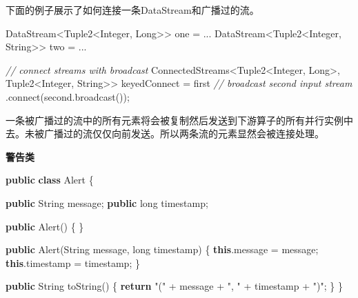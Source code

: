 \documentclass[cn,11pt,chinese]{elegantbook}
\newenvironment{Shaded}{}{}
\newcommand{\BuiltInTok}[1]{#1}
\newcommand{\CommentTok}[1]{\textcolor[rgb]{0.38,0.63,0.69}{\textit{#1}}}
\newcommand{\DataTypeTok}[1]{\textcolor[rgb]{0.56,0.13,0.00}{#1}}
\newcommand{\FunctionTok}[1]{\textcolor[rgb]{0.02,0.16,0.49}{#1}}
\newcommand{\KeywordTok}[1]{\textcolor[rgb]{0.00,0.44,0.13}{\textbf{#1}}}
\newcommand{\NormalTok}[1]{#1}
\newcommand{\StringTok}[1]{\textcolor[rgb]{0.25,0.44,0.63}{#1}}
\begin{document}
下面的例子展示了如何连接一条DataStream和广播过的流。

\begin{Shaded}
\begin{Highlighting}[]
\NormalTok{DataStream\textless{}Tuple2\textless{}}\BuiltInTok{Integer}\NormalTok{, }\BuiltInTok{Long}\NormalTok{\textgreater{}\textgreater{} one = ...}
\NormalTok{DataStream\textless{}Tuple2\textless{}}\BuiltInTok{Integer}\NormalTok{, }\BuiltInTok{String}\NormalTok{\textgreater{}\textgreater{} two = ...}

\CommentTok{// connect streams with broadcast}
\NormalTok{ConnectedStreams\textless{}Tuple2\textless{}}\BuiltInTok{Integer}\NormalTok{, }\BuiltInTok{Long}\NormalTok{\textgreater{}, Tuple2\textless{}}\BuiltInTok{Integer}\NormalTok{, }\BuiltInTok{String}\NormalTok{\textgreater{}\textgreater{} keyedConnect = first}
  \CommentTok{// broadcast second input stream}
\NormalTok{  .}\FunctionTok{connect}\NormalTok{(second.}\FunctionTok{broadcast}\NormalTok{());}
\end{Highlighting}
\end{Shaded}

一条被广播过的流中的所有元素将会被复制然后发送到下游算子的所有并行实例中去。未被广播过的流仅仅向前发送。所以两条流的元素显然会被连接处理。

\textbf{警告类}

\begin{Shaded}
\begin{Highlighting}[]
\KeywordTok{public} \KeywordTok{class}\NormalTok{ Alert \{}

    \KeywordTok{public} \BuiltInTok{String}\NormalTok{ message;}
    \KeywordTok{public} \DataTypeTok{long}\NormalTok{ timestamp;}

    \KeywordTok{public} \FunctionTok{Alert}\NormalTok{() \{ \}}

    \KeywordTok{public} \FunctionTok{Alert}\NormalTok{(}\BuiltInTok{String}\NormalTok{ message, }\DataTypeTok{long}\NormalTok{ timestamp) \{}
        \KeywordTok{this}\NormalTok{.}\FunctionTok{message}\NormalTok{ = message;}
        \KeywordTok{this}\NormalTok{.}\FunctionTok{timestamp}\NormalTok{ = timestamp;}
\NormalTok{    \}}

    \KeywordTok{public} \BuiltInTok{String} \FunctionTok{toString}\NormalTok{() \{}
        \KeywordTok{return} \StringTok{"("}\NormalTok{ + message + }\StringTok{", "}\NormalTok{ + timestamp + }\StringTok{")"}\NormalTok{;}
\NormalTok{    \}}
\NormalTok{\}}
\end{Highlighting}
\end{Shaded}
\end{document}
